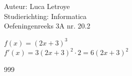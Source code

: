 \documentclass[a4paper]{article}
\begin{document}
  
\noindent \large Auteur: Luca Letroye        \\
\noindent \large Studierichting: Informatica \\
\noindent \large Oefeningenreeks 3A nr. 20.2 \\

\medskip

\normalsize

$f(x) = (2x+3)^3$\\

$f'(x) = 3(2x+3)^2\cdot 2 = 6(2x+3)^2$


\begin{thebibliography}{999}
\end{thebibliography}
\end{document}
